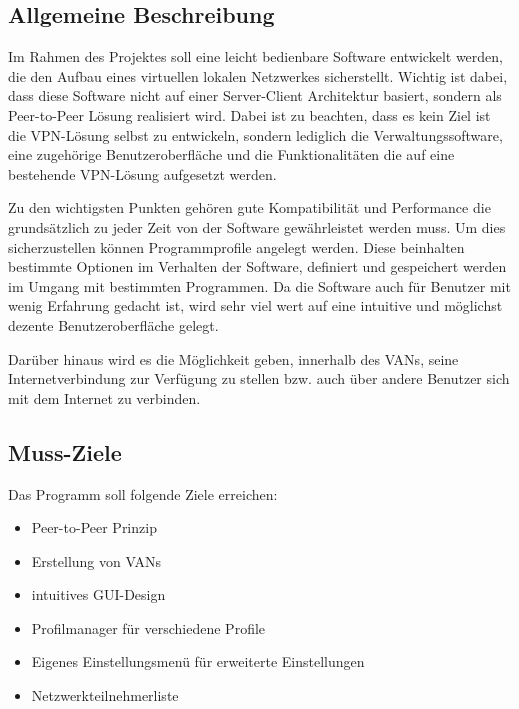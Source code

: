 \documentclass[a4paper,12pt]{scrreprt}
\begin{document}
		\subsection{Allgemeine Beschreibung}
		
		Im Rahmen des Projektes soll eine leicht bedienbare Software entwickelt werden, die den Aufbau eines virtuellen lokalen Netzwerkes sicherstellt. Wichtig ist dabei, dass diese Software nicht auf einer Server-Client Architektur basiert, sondern als Peer-to-Peer Lösung realisiert wird. Dabei ist zu beachten, dass es kein Ziel ist die VPN-Lösung selbst zu entwickeln, sondern lediglich die Verwaltungssoftware, eine zugehörige Benutzeroberfläche und die Funktionalitäten die auf eine bestehende VPN-Lösung aufgesetzt werden.
		
		Zu den wichtigsten Punkten gehören gute Kompatibilität und Performance die grundsätzlich zu jeder Zeit von der Software gewährleistet werden muss. Um dies sicherzustellen können Programmprofile angelegt werden. Diese beinhalten bestimmte Optionen im Verhalten der Software, definiert und gespeichert werden im Umgang mit bestimmten Programmen. Da die Software auch für Benutzer mit wenig Erfahrung gedacht ist, wird sehr viel wert auf eine intuitive und möglichst dezente Benutzeroberfläche gelegt.
		
		Darüber hinaus wird es die Möglichkeit geben, innerhalb des VANs, seine Internetverbindung zur Verfügung zu stellen bzw. auch über andere Benutzer sich mit dem Internet zu verbinden. 
		
			
		\subsection{Muss-Ziele}
		Das Programm soll folgende Ziele erreichen:\\
		\begin{itemize}
		\item Peer-to-Peer Prinzip
		\item Erstellung von VANs
		\item intuitives GUI-Design
		\item Profilmanager für verschiedene Profile
		\item Eigenes Einstellungsmenü für erweiterte Einstellungen
		\item Netzwerkteilnehmerliste
		
		\end{itemize}
		
			
\end{document}
